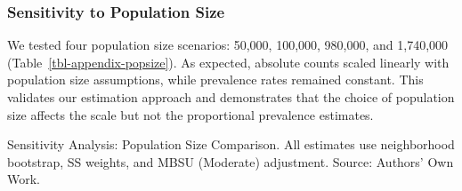 \documentclass[
  12pt,
  letterpaper,
  DIV=11,
  numbers=noendperiod]{scrartcl}
\theoremstyle{plain}
\theoremstyle{definition}
\begin{document}
\begin{table}
{}

\end{table}%

\subsubsection{Sensitivity to Population
Size}\label{sensitivity-to-population-size}

We tested four population size scenarios: 50,000, 100,000, 980,000, and
1,740,000 (Table~\ref{tbl-appendix-popsize}). As expected, absolute
counts scaled linearly with population size assumptions, while
prevalence rates remained constant. This validates our estimation
approach and demonstrates that the choice of population size affects the
scale but not the proportional prevalence estimates.

\begin{table}

\caption{\label{tbl-appendix-popsize}Sensitivity Analysis: Population
Size Comparison. All estimates use neighborhood bootstrap, SS weights,
and MBSU (Moderate) adjustment. Source: Authors' Own Work.}

\centering{

\centering\begingroup\fontsize{8}{10}\selectfont

}
\end{table}
\end{document}
